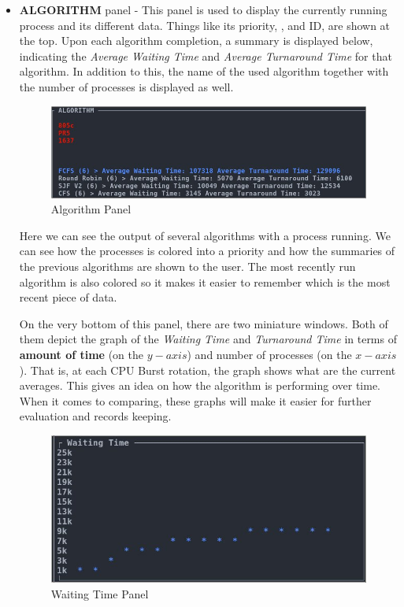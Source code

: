 \documentclass{article}
\newcommand{\code}[1]{\codeinline{\texttt{#1}}}
\begin{document}
\begin{itemize}
\item \textbf{ALGORITHM} panel - This panel is used to display the currently running process and its different data. Things like its priority, \code{ttl}, and ID, are shown at the top. Upon each algorithm completion, a summary is displayed below, indicating the \textit{Average Waiting Time} and \textit{Average Turnaround Time} for that algorithm. In addition to this, the name of the used algorithm together with the number of processes is displayed as well.

  \begin{figure}[H]
    \includegraphics[width=\linewidth]{./pics/alg.jpg}
    \caption{Algorithm Panel}
    \label{fig:Algorithm Panel}
  \end{figure}

  Here we can see the output of several algorithms with a process running. We can see how the processes is colored into a priority and how the summaries of the previous algorithms are shown to the user. The most recently run algorithm is also colored so it makes it easier to remember which is the most recent piece of data.

  On the very bottom of this panel, there are two miniature windows. Both of them depict the graph of the \textit{Waiting Time} and \textit{Turnaround Time} in terms of \textbf{amount of time} (on the $y-axis$) and number of processes (on the $x-axis$). That is, at each CPU Burst rotation, the graph shows what are the current averages. This gives an idea on how the algorithm is performing over time. When it comes to comparing, these graphs will make it easier for further evaluation and records keeping.

  \begin{figure}[H]
    \centering
    \includegraphics[width=0.75\columnwidth]{./pics/awt.jpg}
    \caption{Waiting Time Panel}
    \label{fig:Waiting Time Panel}
  \end{figure}


\end{itemize}
\end{document}
